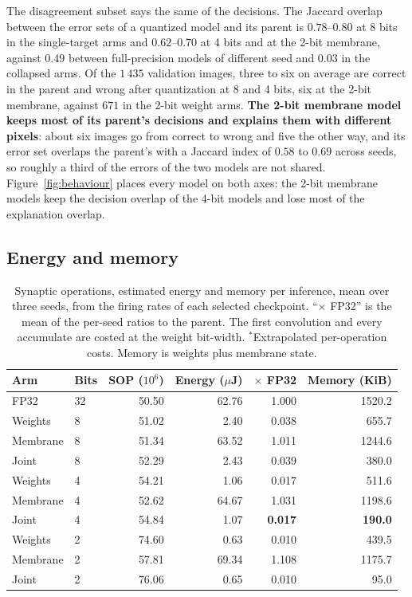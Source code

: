 The disagreement subset says the same of the decisions. The Jaccard overlap
between the error sets of a quantized model and its parent is $0.78$--$0.80$ at
8 bits in the single-target arms and $0.62$--$0.70$ at 4 bits and at the 2-bit
membrane, against $0.49$ between full-precision models of different seed and
$0.03$ in the collapsed arms. Of the $1\,435$ validation images, three to six on
average are correct in the parent and wrong after quantization at 8 and 4 bits,
six at the 2-bit membrane, against $671$ in the 2-bit weight arms. \textbf{The
2-bit membrane model keeps most of its parent's decisions and explains them with
different pixels}: about six images go from correct to wrong and five the other
way, and its error set overlaps the parent's with a Jaccard index of $0.58$ to
$0.69$ across seeds, so roughly a third of the errors of the two models are not
shared. Figure~\ref{fig:behaviour} places every model on both axes: the 2-bit membrane
models keep the decision overlap of the 4-bit models and lose most of the
explanation overlap.

\subsection{Energy and memory}
\label{sec:energy-grid}

\begin{table}[htbp]
\centering
\begin{tabular}{llrrrr}
\toprule
Arm & Bits & SOP ($10^6$) & Energy ($\mu$J) & $\times$ FP32 & Memory (KiB) \\
\midrule
FP32 & 32 & 50.50 & 62.76 & 1.000 & 1520.2 \\
\midrule
Weights  & 8 & 51.02 & 2.40  & 0.038 & 655.7 \\
Membrane & 8 & 51.34 & 63.52 & 1.011 & 1244.6 \\
Joint    & 8 & 52.29 & 2.43  & 0.039 & 380.0 \\
\midrule
Weights  & 4 & 54.21 & 1.06\rlap{$^*$}  & 0.017 & 511.6 \\
Membrane & 4 & 52.62 & 64.67 & 1.031 & 1198.6 \\
Joint    & 4 & 54.84 & 1.07\rlap{$^*$}  & \textbf{0.017} & \textbf{190.0} \\
\midrule
Weights  & 2 & 74.60 & 0.63\rlap{$^*$}  & 0.010 & 439.5 \\
Membrane & 2 & 57.81 & 69.34 & 1.108 & 1175.7 \\
Joint    & 2 & 76.06 & 0.65\rlap{$^*$}  & 0.010 & 95.0 \\
\bottomrule
\end{tabular}
\caption{Synaptic operations, estimated energy and memory per inference, mean
over three seeds, from the firing rates of each selected checkpoint. ``$\times$
FP32'' is the mean of the per-seed ratios to the parent. The first convolution
and every accumulate are costed at the weight bit-width. $^*$Extrapolated per-operation costs. Memory
is weights plus membrane state.}
\label{tab:energy-grid}
\end{table}

